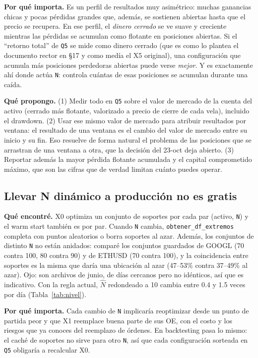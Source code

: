 \documentclass[11pt,a4paper]{article}
\newcommand{\code}[1]{\texttt{\small #1}}
\begin{document}
\textbf{Por qué importa.} Es un perfil de resultados muy asimétrico: muchas ganancias chicas y pocas
pérdidas grandes que, además, se sostienen abiertas hasta que el precio se recupera. En ese perfil, el
\emph{dinero cerrado} se ve suave y creciente mientras las pérdidas se acumulan como flotante en
posiciones abiertas. Si el ``retorno total'' de \code{Q5} se mide como dinero cerrado (que es como lo
plantea el documento rector en §17 y como medía el X5 original), una configuración que acumula más
posiciones perdedoras abiertas puede verse \emph{mejor}. Y es exactamente ahí donde actúa \code{N}:
controla cuántas de esas posiciones se acumulan durante una caída.

\textbf{Qué propongo.} (1) Medir todo en \code{Q5} sobre el valor de mercado de la cuenta del activo
(cerrado más flotante, valorizado a precio de cierre de cada vela), incluido el drawdown. (2) Usar ese
mismo valor de mercado para atribuir resultados por ventana: el resultado de una ventana es el cambio del
valor de mercado entre su inicio y su fin. Eso resuelve de forma natural el problema de las posiciones
que se arrastran de una ventana a otra, que la decisión del 23-oct deja abierto. (3) Reportar además la
mayor pérdida flotante acumulada y el capital comprometido máximo, que son las cifras que de verdad
limitan cuánto puedes operar.


\subsection{Llevar N dinámico a producción no es gratis}\label{sec:produccion}

\textbf{Qué encontré.} X0 optimiza un conjunto de soportes por cada par (activo, \code{N}) y el warm
start también es por par. Cuando \code{N} cambia, \code{obtener\_df\_extremos} completa con puntos
aleatorios o borra soportes al azar. Además, los conjuntos de distinto \code{N} no están anidados: comparé
los conjuntos guardados de GOOGL (70 contra 100, 80 contra 90) y de ETHUSD (70 contra 100), y la
coincidencia entre soportes es la misma que daría una ubicación al azar (47--53\% contra 37--49\% al
azar). Ojo: son archivos de junio, de días cercanos pero no idénticos, así que es indicativo. Con la
regla actual, $\hat N$ redondeado a 10 cambia entre 0.4 y 1.5 veces por día (Tabla~\ref{tab:nivel}).

\textbf{Por qué importa.} Cada cambio de \code{N} implicaría reoptimizar desde un punto de partida peor
y que X1 reemplace buena parte de sus OE, con el costo y los riesgos que ya conoces del reemplazo de
órdenes. En backtesting pasa lo mismo: el caché de soportes no sirve para otro \code{N}, así que cada
configuración sorteada en \code{Q5} obligaría a recalcular X0.
\end{document}
